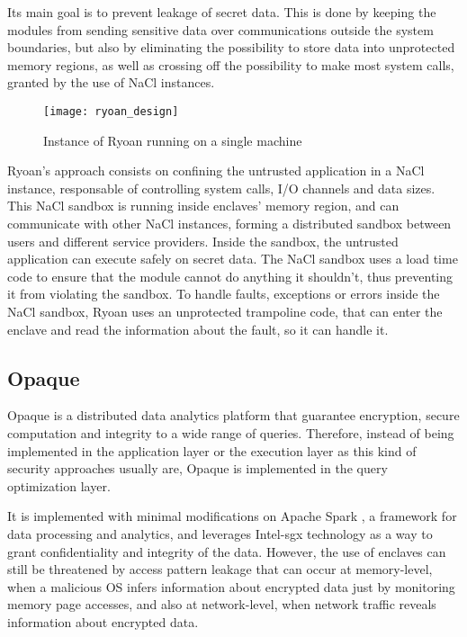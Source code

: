 Its main goal is to prevent leakage of secret data. This is done by keeping the modules from sending sensitive data over communications outside the system boundaries, but also by eliminating the possibility to store data into unprotected memory regions, as well as crossing off the possibility to make most system calls, granted by the use of NaCl instances. 


\begin{figure}[htbp]
	\centering
	{\texttt{[image: ryoan\_design]}}
	\caption{Instance of Ryoan running on a single machine}
\end{figure}

Ryoan's approach consists on confining the untrusted application in a NaCl instance, responsable of controlling system calls, I/O channels and data sizes. This NaCl sandbox is running inside enclaves' memory region, and can communicate with other NaCl instances, forming a distributed sandbox between users and different service providers. Inside the sandbox, the untrusted application can execute safely on secret data. The NaCl sandbox uses a load time code to ensure that the module cannot do anything it shouldn't, thus preventing it from violating the sandbox. To handle faults, exceptions or errors inside the NaCl sandbox, Ryoan uses an unprotected trampoline code, that can enter the enclave and read the information about the fault, so it can handle it.
\subsection{Opaque}
\label{ssec:opaque}

Opaque \cite{opaquePaper} is a distributed data analytics platform that guarantee encryption, secure computation and integrity to a wide range of queries. Therefore, instead of being implemented in the application layer or the execution layer as this kind of security approaches usually are, Opaque is implemented in the query optimization layer. 

It is implemented with minimal modifications on Apache Spark \cite{apacheSparkPaper}, a framework for data processing and analytics, and leverages Intel-\gls{sgx} technology as a way to grant confidentiality and integrity of the data. 
However, the use of enclaves can still be threatened by access pattern leakage that can occur at memory-level, when a malicious OS infers information about encrypted data just by monitoring memory page accesses, and also at network-level, when network traffic reveals information about encrypted data.

